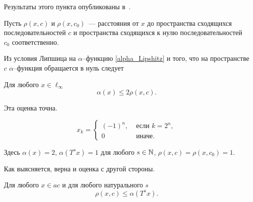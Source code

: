 Результаты этого пункта опубликованы в~\cite{our-mz2019ac0}.

Пусть $\rho(x,c)$ и $\rho(x,c_0)$~--- расстояния от $x$ до пространства сходящихся последовательностей $c$
и пространства сходящихся к нулю последовательностей $c_0$ соответственно.

Из условия Липшица на $\alpha$--функцию \eqref{alpha_Lipshitz}
и того, что на пространстве $c$
$\alpha$--функция обращается в нуль следует

\begin{lemma}
\label{thm:alpha_x_leq_2_rho_x_c}
	Для любого $x\in\ell_\infty$
	\begin{equation}
		\alpha(x) \leq 2\rho(x, c)
		.
	\end{equation}
\end{lemma}


Эта оценка точна.
\begin{example}
\label{ex:alpha_ac_rho_x_c}
	\begin{equation}
	\label{eq:alpha_ac_distance_example_y}
		x_k = \begin{cases}
			(-1)^n, &\mbox{~если~} k = 2^n,
			\\
			0 &\mbox{~иначе.}
		\end{cases}
	\end{equation}
\end{example}
Здесь $\alpha(x) = 2$, $\alpha(T^s x) = 1$ для любого $s\in\mathbb{N}$, $\rho(x,c) = \rho(x, c_0) = 1$.

Как выясняется, верна и оценка с другой стороны.

\begin{lemma}
\label{thm:rho_x_c_leq_alpha_t_s_x}
	Для любого $x\in ac$ и для любого натурального $s$
	\begin{equation}
		\rho(x,c)\leq \alpha(T^s x)
		.
	\end{equation}
\end{lemma}

